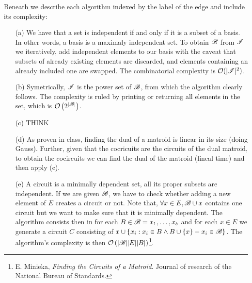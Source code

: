 Beneath we describe each algorithm indexed by the label of the edge and include its complexity:
\begin{itemize}
    \item[(a)] 
        We have that a set is independent if and only if it is a subset of a basis.
        In other words, a basis is a maximaly independent set.
        To obtain $\mathscr{B}$ from $\mathscr{I}$ we iteratively, add independent elements to our basis with the caveat that subsets of already existing elements are discarded, and elements containing an already included one are swapped.
        The combinatorial complexity is $\mathcal{O}(|\mathscr{I}|^2)$.
    \item[(b)] Symetrically, $\mathscr{I}$ is the power set of $\mathscr{B}$, from which the algorithm clearly follows. The complexity is ruled by printing or returning all elements in the set, which is $\mathcal{O}\left(2^{|\mathscr{B}|}\right)$.
    \item[(c)] THINK
    \item[(d)] As proven in class, finding the dual of a matroid is linear in its size (doing Gauss). Further, given that the cocricuits are the circuits of the dual matroid, to obtain the cocircuits we can find the dual of the matroid (lineal time) and then apply (c).
    \item[(e)] A circuit is a minimally dependent set, all its proper subsets are independent. If we are given $\mathscr{B}$, we have to check whether adding a new element of $E$ creates a circuit or not. Note that, $\forall x \in E, \mathscr{B} \cup x$ contains one circuit but we want to make sure that it is minimally dependent. The algorithm consists then in for each $B \in \mathscr{B} = {x_1, \dots, x_b}$ and for each $x \in E$ we generate a circuit $C$ consisting of $x \cup \lbrace x_i : x_i \in B \wedge B \cup \{ x\} - x_i \in \mathscr{B} \rbrace$. The algorithm's complexity is then $\mathcal{O}\left(|\mathscr{B}||E||B|\right)$\footnote{E. Minieka, \textit{Finding the Circuits of a Matroid}. Journal of research of the National Bureau of Standards.}.
\end{itemize}
